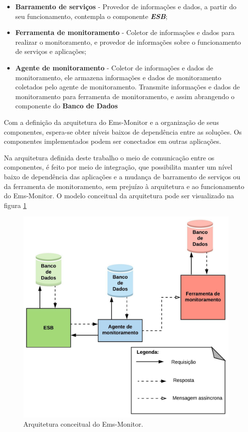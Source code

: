 \begin{itemize}
    \item \textbf{Barramento de serviços} - Provedor de informações e dados, a partir do seu funcionamento, contempla o componente \textbf{\textit{\acrshort{ESB}}}; 
    \item \textbf{Ferramenta de monitoramento} - Coletor de informações e dados para realizar o monitoramento, e provedor de informações sobre o funcionamento de serviços e aplicações; 
    \item \textbf{Agente de monitoramento} - Coletor de informações e dados de monitoramento, ele armazena informações e dados de monitoramento coletados pelo agente de monitoramento. Transmite informações e dados de monitoramento para ferramenta de monitoramento, e assim abrangendo o componente do \textbf{Banco de Dados}
\end{itemize}

Com a definição da arquitetura do Ems-Monitor e a organização de seus componentes, espera-se obter níveis baixos de dependência entre as soluções. Os componentes implementados podem ser conectados em outras aplicações. 

Na arquitetura definida deste trabalho o meio de comunicação entre os componentes, é feito por meio de integração, que possibilita manter um nível baixo de dependência das aplicações e a mudança de barramento de serviços ou da ferramenta de monitoramento, sem prejuízo à arquitetura e ao funcionamento do Ems-Monitor. O modelo conceitual da arquitetura pode ser visualizado na figura \ref{fun:fig:arquitetura_conceitual_monitoramento}

\begin{figure}[H]
	\begin{center}
	\includegraphics[scale = 0.90]{img/Arquitetura_Proposta_para_Monitoramento.jpeg}
		\caption{Arquitetura conceitual do Ems-Monitor.}
		\label{fun:fig:arquitetura_conceitual_monitoramento}
	\end{center}
\end{figure}

